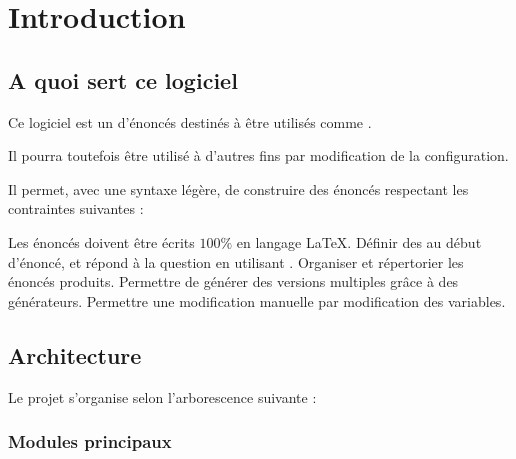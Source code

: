 \section{Introduction}

\subsection{A quoi sert ce logiciel}
Ce logiciel est un  d'énoncés destinés à être utilisés comme . 

Il pourra toutefois être utilisé à d'autres fins par modification de la configuration.

Il permet, avec une syntaxe légère, de construire des énoncés respectant les contraintes suivantes : 
\begin{tcbenumerate}
    \tcbitem Les énoncés doivent être écrits $100\%$ en langage \LaTeX.
    \tcbitem Définir des  au début d'énoncé, et répond à la question en utilisant .
    \tcbitem Organiser et répertorier les énoncés produits. 
    \tcbitem Permettre de générer des versions multiples grâce à des générateurs. 
    \tcbitem Permettre une modification manuelle  par modification des variables. 
\end{tcbenumerate}

\subsection{Architecture}

Le projet s'organise selon l'arborescence suivante :


\subsubsection{Modules principaux}

